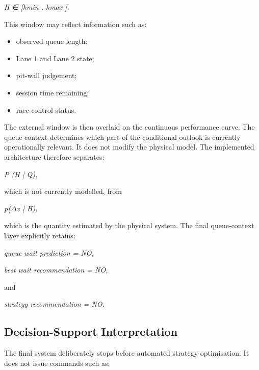 \begin{center}\textit{H ∈ [hmin , hmax ].}\end{center}

This window may reflect information such as:

\begin{itemize}
\item observed queue length;
\item Lane 1 and Lane 2 state;
\item pit-wall judgement;
\item session time remaining;
\item race-control status.
\end{itemize}

The external window is then overlaid on the continuous performance curve. The queue context determines which part of the conditional outlook is currently operationally relevant. It does not modify the physical model. The implemented architecture therefore separates:

\begin{center}\textit{P (H | Q),}\end{center}

which is not currently modelled, from

\begin{center}\textit{p(\ensuremath{\Delta}v | H),}\end{center}

which is the quantity estimated by the physical system. The final queue-context layer explicitly retains:

\begin{center}\textit{queue wait prediction = NO,}\end{center}

\begin{center}\textit{best wait recommendation = NO,}\end{center}

and

\begin{center}\textit{strategy recommendation = NO.}\end{center}

\subsection{Decision-Support Interpretation}
The final system deliberately stops before automated strategy optimisation. It does not issue commands such as:

